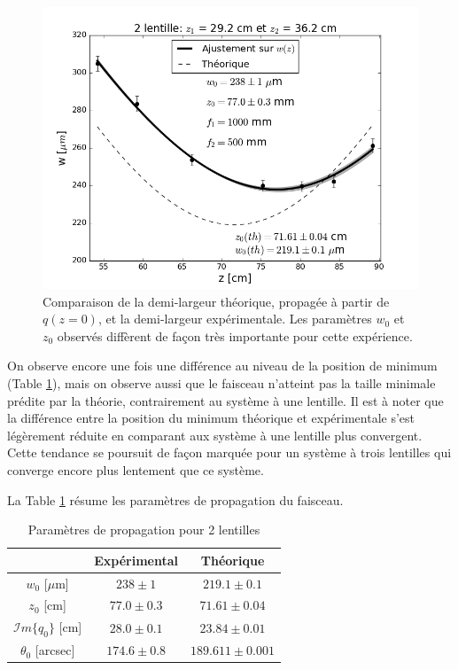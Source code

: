\documentclass[10pt,letterpaper,twocolumn]{article}
\begin{document}
\begin{figure}[H]
	\centering
	\includegraphics[width=\linewidth]{figures/w3.png}
	\caption{Comparaison de la demi-largeur théorique, propagée à partir de $q(z=0)$, et la demi-largeur expérimentale. Les paramètres $w_0$ et $z_0$ observés diffèrent de façon très importante pour cette expérience. }
	\label{fig:w3}
	
\end{figure}
 On observe encore une fois une différence au niveau de la position de minimum (Table \ref{tab:w3}), mais on observe aussi que le faisceau n'atteint pas la taille minimale prédite par la théorie, contrairement au système à une lentille. Il est à noter que la différence entre la position du minimum théorique et expérimentale s'est légèrement réduite en comparant aux système à une lentille plus convergent. Cette tendance se poursuit de façon marquée pour un système à trois lentilles qui converge encore plus lentement que ce système. \par La Table \ref{tab:w3} résume les paramètres de propagation du faisceau.
\begin{table}[H]
	\centering
	\caption{Paramètres de propagation pour 2 lentilles}
	\label{tab:w3}
	\begin{tabular}{|c|c|c|}
		\hline
			&Expérimental & Théorique \\\hline
		$w_0$ [$\mu$m] & $238 \pm 1$& $219.1 \pm 0.1$ \\\hline
		  $z_0$ [cm] & $77.0 \pm 0.3$  & $71.61 \pm 0.04$ \\\hline
		  $\mathcal{I}m\{q_0\}$ [cm]  & $28.0 \pm 0.1$  & $23.84 \pm 0.01$ \\\hline
		  $\theta_0$ [arcsec]& $174.6 \pm 0.8$ & $189.611 \pm  0.001$ \\\hline
	\end{tabular}
\end{table}
\end{document}
